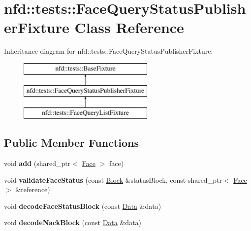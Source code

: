 \hypertarget{classnfd_1_1tests_1_1FaceQueryStatusPublisherFixture}{}\section{nfd\+:\+:tests\+:\+:Face\+Query\+Status\+Publisher\+Fixture Class Reference}
\label{classnfd_1_1tests_1_1FaceQueryStatusPublisherFixture}
Inheritance diagram for nfd\+:\+:tests\+:\+:Face\+Query\+Status\+Publisher\+Fixture\+:\begin{figure}[H]
\begin{center}
\leavevmode
\includegraphics[height=3.000000cm]{classnfd_1_1tests_1_1FaceQueryStatusPublisherFixture}
\end{center}
\end{figure}
\subsection*{Public Member Functions}
\begin{DoxyCompactItemize}
\item 
void {\bfseries add} (shared\+\_\+ptr$<$ \hyperlink{classnfd_1_1Face}{Face} $>$ face)\hypertarget{classnfd_1_1tests_1_1FaceQueryStatusPublisherFixture_a236e742fd94efb7da4e3bb9152818fc1}{}\label{classnfd_1_1tests_1_1FaceQueryStatusPublisherFixture_a236e742fd94efb7da4e3bb9152818fc1}

\item 
void {\bfseries validate\+Face\+Status} (const \hyperlink{classndn_1_1Block}{Block} \&status\+Block, const shared\+\_\+ptr$<$ \hyperlink{classnfd_1_1Face}{Face} $>$ \&reference)\hypertarget{classnfd_1_1tests_1_1FaceQueryStatusPublisherFixture_aa194c9e6611ab0fcfb0161cae22bd123}{}\label{classnfd_1_1tests_1_1FaceQueryStatusPublisherFixture_aa194c9e6611ab0fcfb0161cae22bd123}

\item 
void {\bfseries decode\+Face\+Status\+Block} (const \hyperlink{classndn_1_1Data}{Data} \&data)\hypertarget{classnfd_1_1tests_1_1FaceQueryStatusPublisherFixture_ab9da9716588a119ae1e293ee1d4596c1}{}\label{classnfd_1_1tests_1_1FaceQueryStatusPublisherFixture_ab9da9716588a119ae1e293ee1d4596c1}

\item 
void {\bfseries decode\+Nack\+Block} (const \hyperlink{classndn_1_1Data}{Data} \&data)\hypertarget{classnfd_1_1tests_1_1FaceQueryStatusPublisherFixture_a55166f7bb9b9ab2e6d5a137adccb47fd}{}\label{classnfd_1_1tests_1_1FaceQueryStatusPublisherFixture_a55166f7bb9b9ab2e6d5a137adccb47fd}

\end{DoxyCompactItemize}
